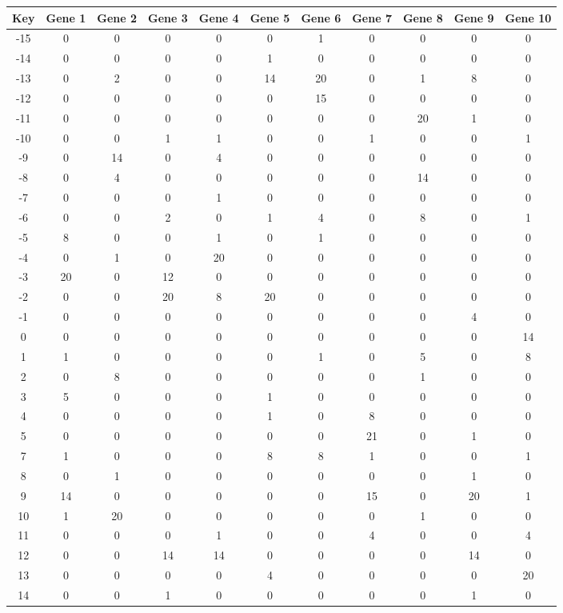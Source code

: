 \begin{tabular}{|c|c|c|c|c|c|c|c|c|c|c|}
\hline
Key & Gene 1 & Gene 2 & Gene 3 & Gene 4 & Gene 5 & Gene 6 & Gene 7 & Gene 8 & Gene 9 & Gene 10 \\
\hline
-15 & 0 & 0 & 0 & 0 & 0 & 1 & 0 & 0 & 0 & 0 \\
-14 & 0 & 0 & 0 & 0 & 1 & 0 & 0 & 0 & 0 & 0 \\
-13 & 0 & 2 & 0 & 0 & 14 & 20 & 0 & 1 & 8 & 0 \\
-12 & 0 & 0 & 0 & 0 & 0 & 15 & 0 & 0 & 0 & 0 \\
-11 & 0 & 0 & 0 & 0 & 0 & 0 & 0 & 20 & 1 & 0 \\
-10 & 0 & 0 & 1 & 1 & 0 & 0 & 1 & 0 & 0 & 1 \\
-9 & 0 & 14 & 0 & 4 & 0 & 0 & 0 & 0 & 0 & 0 \\
-8 & 0 & 4 & 0 & 0 & 0 & 0 & 0 & 14 & 0 & 0 \\
-7 & 0 & 0 & 0 & 1 & 0 & 0 & 0 & 0 & 0 & 0 \\
-6 & 0 & 0 & 2 & 0 & 1 & 4 & 0 & 8 & 0 & 1 \\
-5 & 8 & 0 & 0 & 1 & 0 & 1 & 0 & 0 & 0 & 0 \\
-4 & 0 & 1 & 0 & 20 & 0 & 0 & 0 & 0 & 0 & 0 \\
-3 & 20 & 0 & 12 & 0 & 0 & 0 & 0 & 0 & 0 & 0 \\
-2 & 0 & 0 & 20 & 8 & 20 & 0 & 0 & 0 & 0 & 0 \\
-1 & 0 & 0 & 0 & 0 & 0 & 0 & 0 & 0 & 4 & 0 \\
0 & 0 & 0 & 0 & 0 & 0 & 0 & 0 & 0 & 0 & 14 \\
1 & 1 & 0 & 0 & 0 & 0 & 1 & 0 & 5 & 0 & 8 \\
2 & 0 & 8 & 0 & 0 & 0 & 0 & 0 & 1 & 0 & 0 \\
3 & 5 & 0 & 0 & 0 & 1 & 0 & 0 & 0 & 0 & 0 \\
4 & 0 & 0 & 0 & 0 & 1 & 0 & 8 & 0 & 0 & 0 \\
5 & 0 & 0 & 0 & 0 & 0 & 0 & 21 & 0 & 1 & 0 \\
7 & 1 & 0 & 0 & 0 & 8 & 8 & 1 & 0 & 0 & 1 \\
8 & 0 & 1 & 0 & 0 & 0 & 0 & 0 & 0 & 1 & 0 \\
9 & 14 & 0 & 0 & 0 & 0 & 0 & 15 & 0 & 20 & 1 \\
10 & 1 & 20 & 0 & 0 & 0 & 0 & 0 & 1 & 0 & 0 \\
11 & 0 & 0 & 0 & 1 & 0 & 0 & 4 & 0 & 0 & 4 \\
12 & 0 & 0 & 14 & 14 & 0 & 0 & 0 & 0 & 14 & 0 \\
13 & 0 & 0 & 0 & 0 & 4 & 0 & 0 & 0 & 0 & 20 \\
14 & 0 & 0 & 1 & 0 & 0 & 0 & 0 & 0 & 1 & 0 \\
\hline
\end{tabular}